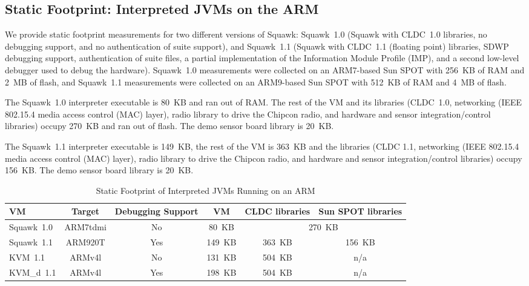 \documentclass{sigplanconf}
\newcommand{\doublecentertablebegin}{\begin{table*}[htp] \begin{center}}
\newcommand{\doublecentertableend}[2]{{\bf \caption{\label{#1} {#2}}} \end{center} \end{table*} }
\begin{document}
\subsection{Static Footprint: Interpreted JVMs on the ARM}

We provide static footprint measurements for two different versions 
of Squawk: Squawk~1.0 (Squawk with CLDC~1.0 libraries, no debugging 
support, and no authentication of suite support), and Squawk~1.1 
(Squawk with CLDC~1.1 (floating point) libraries, SDWP debugging support, 
authentication of suite files, a partial implementation of the
Information Module Profile (IMP), and a second low-level debugger 
used to debug the hardware).  
Squawk~1.0 measurements were collected on an ARM7-based Sun SPOT 
with 256~KB of RAM and 2~MB of flash, 
and Squawk~1.1 measurements were collected on an ARM9-based Sun SPOT
with 512~KB of RAM and 4~MB of flash. 

The Squawk~1.0 interpreter executable is 80~KB and ran out of RAM. 
The rest of the VM and its libraries (CLDC~1.0, networking (IEEE 
802.15.4 media access control (MAC) layer), radio library to drive
the Chipcon radio, and hardware and sensor integration/control 
libraries) occupy 270~KB and ran out of flash. 
The demo sensor board library is 20~KB.

The Squawk~1.1 interpreter executable is 149~KB, 
the rest of the VM is 363~KB and the libraries (CLDC 1.1, networking
(IEEE 802.15.4 media access control (MAC) layer), radio library to drive the
Chipcon radio, and hardware and sensor integration/control libraries) occupy
156~KB.
The demo sensor board library is 20~KB.

\doublecentertablebegin
\begin{tabular}{|l|c|c|c|c|c|} \hline
VM              & Target  & Debugging Support & VM     & CLDC libraries & Sun SPOT libraries \\ \hline
Squawk~1.0      & ARM7tdmi & No                & 80~KB  & \multicolumn{2}{c|}{270~KB} \\
Squawk~1.1      & ARM920T  & Yes               & 149~KB & 363~KB & 156~KB \\
KVM~1.1         & ARMv4l   & No                & 131~KB & 504~KB & n/a \\ 
KVM\_d~1.1      & ARMv4l   & Yes               & 198~KB & 504~KB & n/a \\ \hline
\end{tabular}
\doublecentertableend{table-static-footprint}{Static Footprint of Interpreted JVMs Running on an ARM}
\end{document}
